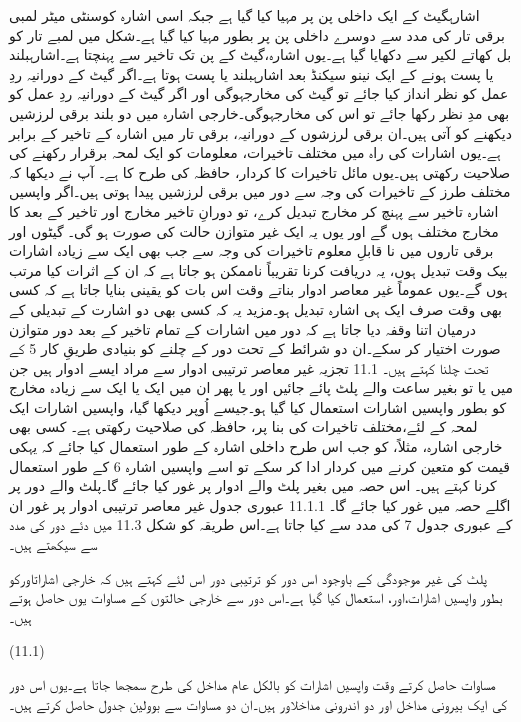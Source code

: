 	 اشارہگیٹ کے ایک داخلی پن پر مہیا کیا گیا ہے جبکہ اسی اشارہ کوسنٹی میٹر لمبی برقی تار کی مدد سے دوسرے داخلی پن پر بطور مہیا کیا گیا ہے۔شکل میں لمبے تار کو بل کھاتے لکیر سے دکھایا گیا ہے۔یوں اشارہ،گیٹ کے پن تک تاخیر سے پہنچتا ہے۔اشارہبلند یا پست ہونے کے ایک نینو سیکنڈ بعد اشارہبلند یا پست ہوتا ہے۔اگر گیٹ کے دورانیہ ردِ عمل کو نظر انداز کیا جائے تو گیٹ کی مخارجہوگی اور اگر گیٹ کے دورانیہ ردِ عمل کو بھی مدِ نظر رکھا جائے تو اس کی مخارجہوگی۔خارجی اشارہ میں دو بلند برقی لرزشیں دیکھنے کو آتی ہیں۔ان برقی لرزشوں کے دورانیہ، برقی تار میں اشارہ کے تاخیر کے برابر ہے۔یوں اشارات کی راہ میں مختلف تاخیرات،  معلومات کو ایک لمحہ برقرار رکھنے کی صلاحیت رکھتی ہیں۔یوں مائل تاخیرات کا کردار، حافظہ کی طرح کا ہے۔
	آپ نے دیکھا کہ مختلف طرز کے تاخیرات کی وجہ سے دور میں برقی لرزشیں پیدا ہوتی ہیں۔اگر واپسیں اشارہ تاخیر سے پہنچ کر مخارج تبدیل کرے، تو دورانِ تاخیر مخارج اور تاخیر کے بعد کا مخارج مختلف ہوں گے اور یوں یہ ایک غیر متوازن حالت کی صورت ہو گی۔
	گیٹوں اور برقی تاروں میں نا قابلِ معلوم تاخیرات کی وجہ سے جب بھی ایک سے زیادہ اشارات بیک وقت تبدیل ہوں، یہ دریافت کرنا تقریباً ناممکن ہو جاتا ہے کہ ان کے اثرات کیا مرتب ہوں گے۔یوں عموماً غیر معاصر ادوار بناتے وقت اس بات کو یقینی بنایا جاتا ہے کہ کسی بھی وقت صرف ایک ہی اشارہ تبدیل ہو۔مزید یہ کہ کسی بھی دو اشارت کے تبدیلی کے درمیان اتنا وقفہ دیا جاتا ہے کہ دور میں اشارات کے تمام تاخیر کے بعد دور متوازن صورت اختیار کر سکے۔ان دو شرائط کے تحت دور کے چلنے کو بنیادی طریقِ کار 5 کے تحت چلنا کہتے ہیں۔
11.1 تجزیہ
	غیر معاصر ترتیبی ادوار سے مراد ایسے ادوار ہیں جن میں یا تو بغیر ساعت والے پلٹ پائے جائیں اور یا پھر ان میں ایک یا ایک سے زیادہ مخارج کو بطور واپسیں اشارات استعمال کیا گیا ہو۔جیسے اُوپر دیکھا گیا، واپسیں اشارات ایک لمحہ کے لئے،مختلف تاخیرات کی بنا پر، حافظہ کی صلاحیت رکھتی ہے۔
	کسی بھی خارجی اشارہ، مثلاً،  کو جب اس طرح داخلی اشارہ کے طور استعمال  کیا جائے کہ یہکی قیمت کو متعین کرنے میں کردار ادا کر سکے تو اسے واپسیں اشارہ 6 کے طور استعمال کرنا کہتے ہیں۔
	اس حصہ میں بغیر پلٹ والے ادوار پر غور کیا جائے گا۔پلٹ والے دور پر اگلے حصہ میں غور کیا جائے گا۔
11.1.1 عبوری جدول
	غیر معاصر ترتیبی ادوار پر غور ان کے عبوری جدول 7 کی مدد سے کیا جاتا ہے۔اس طریقہ کو شکل 11.3 میں دئے دور کی مدد سے سیکھتے ہیں۔

	پلٹ کی غیر موجودگی کے باوجود اس دور کو ترتیبی دور اس لئے کہتے ہیں کہ خارجی اشاراتاورکو بطور واپسیں اشارات،اور، استعمال کیا گیا ہے۔اس دور سے خارجی حالتوں کے مساوات یوں حاصل ہوتے ہیں۔

 
(11.1)

	مساوات حاصل کرتے وقت واپسیں اشارات کو بالکل عام مداخل کی طرح سمجھا جاتا ہے۔یوں اس دور کی ایک بیرونی مداخل اور دو اندرونی مداخلاور ہیں۔ان دو مساوات سے بوولین جدول حاصل کرتے ہیں۔


